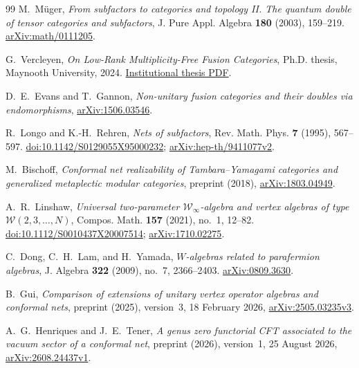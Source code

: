 \begin{thebibliography}{99}
M.~M\"uger,
\emph{From subfactors to categories and topology II.
The quantum double of tensor categories and subfactors},
J. Pure Appl. Algebra \textbf{180} (2003), 159--219.
\href{https://arxiv.org/abs/math/0111205}{arXiv:math/0111205}.

G.~Vercleyen,
\emph{On Low-Rank Multiplicity-Free Fusion Categories},
Ph.D. thesis, Maynooth University, 2024.
\href{https://mural.maynoothuniversity.ie/id/eprint/18958/1/phd.pdf}{Institutional thesis PDF}.

D.~E.~Evans and T.~Gannon,
\emph{Non-unitary fusion categories and their doubles via endomorphisms},
\href{https://arxiv.org/abs/1506.03546}{arXiv:1506.03546}.

R.~Longo and K.-H.~Rehren,
\emph{Nets of subfactors},
Rev. Math. Phys. \textbf{7} (1995), 567--597.
\href{https://doi.org/10.1142/S0129055X95000232}{doi:10.1142/S0129055X95000232};
\href{https://arxiv.org/abs/hep-th/9411077v2}{arXiv:hep-th/9411077v2}.

M.~Bischoff,
\emph{Conformal net realizability of Tambara--Yamagami categories
and generalized metaplectic modular categories},
preprint (2018),
\href{https://arxiv.org/abs/1803.04949}{arXiv:1803.04949}.

A.~R.~Linshaw,
\emph{Universal two-parameter $\mathcal W_\infty$-algebra and vertex
algebras of type $\mathcal W(2,3,\ldots,N)$},
Compos. Math. \textbf{157} (2021), no.~1, 12--82.
\href{https://doi.org/10.1112/S0010437X20007514}{doi:10.1112/S0010437X20007514};
\href{https://arxiv.org/abs/1710.02275}{arXiv:1710.02275}.

C.~Dong, C.~H.~Lam, and H.~Yamada,
\emph{$W$-algebras related to parafermion algebras},
J. Algebra \textbf{322} (2009), no.~7, 2366--2403.
\href{https://arxiv.org/abs/0809.3630}{arXiv:0809.3630}.

B.~Gui,
\emph{Comparison of extensions of unitary vertex operator algebras
and conformal nets},
preprint (2025), version~3, 18 February 2026,
\href{https://arxiv.org/abs/2505.03235v3}{arXiv:2505.03235v3}.

A.~G.~Henriques and J.~E.~Tener,
\emph{A genus zero functorial CFT associated to the vacuum sector
of a conformal net},
preprint (2026), version~1, 25 August 2026,
\href{https://arxiv.org/abs/2608.24437v1}{arXiv:2608.24437v1}.

\end{thebibliography}
